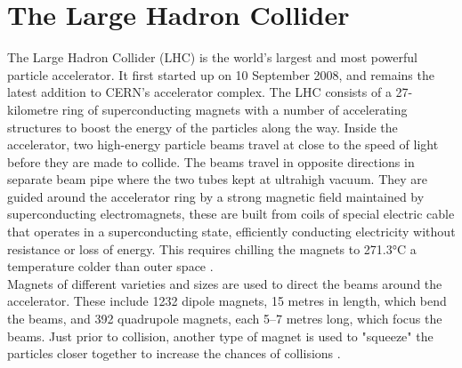 

\section{The Large Hadron Collider}

The Large Hadron Collider (LHC) is the world’s largest and most powerful particle accelerator. It first started up on 10 September 2008, and remains the latest addition to CERN’s accelerator complex. The LHC consists of a 27-kilometre ring of superconducting magnets with a number of accelerating structures to boost the energy of the particles along the way. Inside the accelerator, two high-energy particle beams travel at close to the speed of light before they are made to collide. The beams travel in opposite directions in separate beam pipe where the two tubes kept at ultrahigh vacuum. They are guided around the accelerator ring by a strong magnetic field maintained by superconducting electromagnets, these are built from coils of special electric cable that operates in a superconducting state, efficiently conducting electricity without resistance or loss of energy. This requires chilling the magnets to 271.3°C  a temperature colder than outer space \cite{LHC}.\\ 

Magnets of different varieties and sizes are used to direct the beams around the accelerator. These include 1232 dipole magnets, 15 metres in length, which bend the beams, and 392 quadrupole magnets, each 5–7 metres long, which focus the beams. Just prior to collision, another type of magnet is used to "squeeze" the particles closer together to increase the chances of collisions . \\

